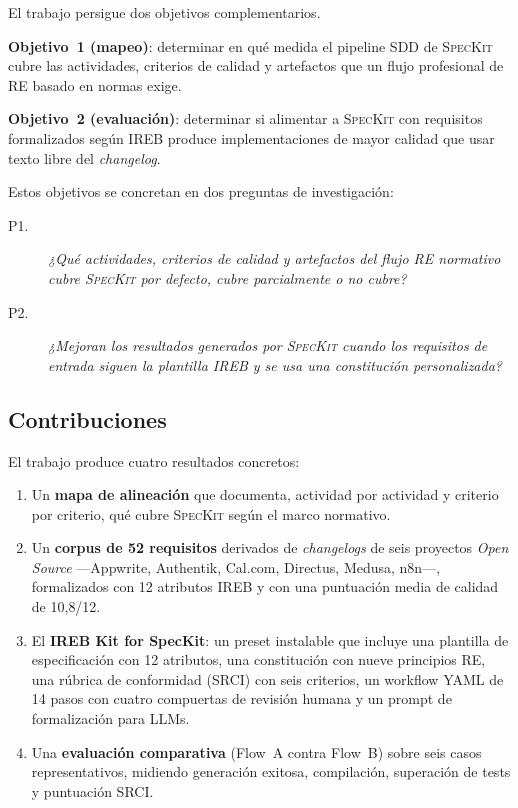 El trabajo persigue dos objetivos complementarios.

\textbf{Objetivo~1 (mapeo)}: determinar en qu\'e medida el pipeline SDD de \textsc{SpecKit} cubre las actividades, criterios de calidad y artefactos que un flujo profesional de RE basado en normas exige.

\textbf{Objetivo~2 (evaluaci\'on)}: determinar si alimentar a \textsc{SpecKit} con requisitos formalizados seg\'un IREB produce implementaciones de mayor calidad que usar texto libre del \emph{changelog}.

Estos objetivos se concretan en dos preguntas de investigaci\'on:

\begin{description}
    \item[P1.] \textit{¿Qu\'e actividades, criterios de calidad y artefactos del flujo RE normativo cubre \textsc{SpecKit} por defecto, cubre parcialmente o no cubre?}
    \item[P2.] \textit{¿Mejoran los resultados generados por \textsc{SpecKit} cuando los requisitos de entrada siguen la plantilla IREB y se usa una constituci\'on personalizada?}
\end{description}

\subsection{Contribuciones}

El trabajo produce cuatro resultados concretos:

\begin{enumerate}
    \item Un \textbf{mapa de alineaci\'on} que documenta, actividad por actividad y criterio por criterio, qu\'e cubre \textsc{SpecKit} seg\'un el marco normativo.
    \item Un \textbf{corpus de 52 requisitos} derivados de \emph{changelogs} de seis proyectos \emph{Open Source} ---Appwrite, Authentik, Cal.com, Directus, Medusa, n8n---, formalizados con 12 atributos IREB y con una puntuaci\'on media de calidad de 10{,}8/12.
    \item El \textbf{IREB Kit for SpecKit}: un preset instalable que incluye una plantilla de especificaci\'on con 12 atributos, una constituci\'on con nueve principios RE, una r\'ubrica de conformidad (SRCI) con seis criterios, un workflow YAML de 14 pasos con cuatro compuertas de revisi\'on humana y un prompt de formalizaci\'on para LLMs.
    \item Una \textbf{evaluaci\'on comparativa} (Flow~A contra Flow~B) sobre seis casos representativos, midiendo generaci\'on exitosa, compilaci\'on, superaci\'on de tests y puntuaci\'on SRCI.
\end{enumerate}

